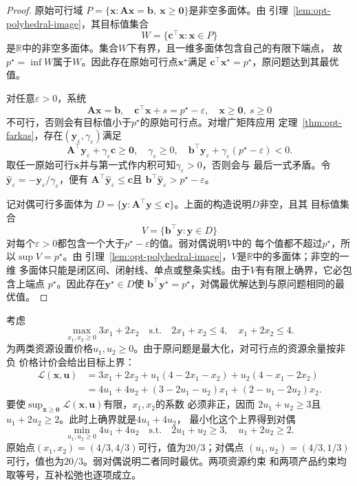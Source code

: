\begin{proof}
原始可行域
$P=\{\bm{x}:\bm{A}\bm{x}=\bm{b},\ \bm{x}\geq\bm{0}\}$是非空多面体。由
引理~\ref{lem:opt-polyhedral-image}，其目标值集合
\[
  W=\{\bm{c}^{\top}\bm{x}:\bm{x}\in P\}
\]
是$\mathbb{R}$中的非空多面体。集合$W$下有界，且一维多面体包含自己的有限下端点，
故$p^\star=\inf W$属于$W$。因此存在原始可行点$\bm{x}^{\star}$满足
$\bm{c}^{\top}\bm{x}^{\star}=p^\star$，原问题达到其最优值。

对任意$\varepsilon>0$，系统
\[
  \bm{A}\bm{x}=\bm{b},\quad
  \bm{c}^{\top}\bm{x}+s=p^\star-\varepsilon,\quad
  \bm{x}\geq\bm{0},\ s\geq0
\]
不可行，否则会有目标值小于$p^\star$的原始可行点。对增广矩阵应用
定理~\ref{thm:opt-farkas}，存在$(\bm{y}_{\varepsilon},\gamma_\varepsilon)$满足
\[
  \bm{A}^{\top}\bm{y}_{\varepsilon}
  +\gamma_\varepsilon\bm{c}\geq\bm{0},\quad
  \gamma_\varepsilon\geq0,\quad
  \bm{b}^{\top}\bm{y}_{\varepsilon}
  +\gamma_\varepsilon(p^\star-\varepsilon)<0.
\]
取任一原始可行$\bar{\bm{x}}$并与第一式作内积可知$\gamma_\varepsilon>0$，否则会与
最后一式矛盾。令
$\widehat{\bm{y}}_\varepsilon=-\bm{y}_\varepsilon/\gamma_\varepsilon$，便有
$\bm{A}^{\top}\widehat{\bm{y}}_\varepsilon\leq\bm{c}$且
$\bm{b}^{\top}\widehat{\bm{y}}_\varepsilon>p^\star-\varepsilon$。

记对偶可行多面体为
$D=\{\bm{y}:\bm{A}^{\top}\bm{y}\leq\bm{c}\}$。上面的构造说明$D$非空，且其
目标值集合
\[
  V=\{\bm{b}^{\top}\bm{y}:\bm{y}\in D\}
\]
对每个$\varepsilon>0$都包含一个大于$p^\star-\varepsilon$的值。弱对偶说明$V$中的
每个值都不超过$p^\star$，所以$\sup V=p^\star$。由
引理~\ref{lem:opt-polyhedral-image}，$V$是$\mathbb{R}$中的多面体；非空的一维
多面体只能是闭区间、闭射线、单点或整条实线。由于$V$有有限上确界，它必包含上端点
$p^\star$。因此存在$\bm{y}^{\star}\in D$使
$\bm{b}^{\top}\bm{y}^{\star}=p^\star$，对偶最优解达到与原问题相同的最优值。
\end{proof}

\begin{example}[二维资源分配的原始与对偶证书]
\label{ex:opt-resource-lp-duality}
考虑
\[
  \max_{x_1,x_2\geq0}3x_1+2x_2
  \quad\text{s.t.}\quad
  2x_1+x_2\leq4,\quad x_1+2x_2\leq4.
\]
为两类资源设置价格$u_1,u_2\geq0$。由于原问题是最大化，对可行点的资源余量按非负
价格计价会给出目标上界：
\begin{align*}
  \mathcal{L}(\bm{x},\bm{u})
  &=
  3x_1+2x_2
  +u_1(4-2x_1-x_2)+u_2(4-x_1-2x_2)\\
  &=
  4u_1+4u_2
  +(3-2u_1-u_2)x_1+(2-u_1-2u_2)x_2.
\end{align*}
要使$\sup_{\bm{x}\geq\bm{0}}\mathcal{L}(\bm{x},\bm{u})$有限，$x_1,x_2$的系数
必须非正，因而
$2u_1+u_2\geq3$且$u_1+2u_2\geq2$。此时上确界就是$4u_1+4u_2$，
最小化这个上界得到对偶
\[
  \min_{u_1,u_2\geq0}4u_1+4u_2
  \quad\text{s.t.}\quad
  2u_1+u_2\geq3,\quad u_1+2u_2\geq2.
\]
原始点$(x_1,x_2)=(4/3,4/3)$可行，值为$20/3$；对偶点
$(u_1,u_2)=(4/3,1/3)$可行，值也为$20/3$。弱对偶说明二者同时最优。两项资源约束
和两项产品约束均取等号，互补松弛也逐项成立。
\end{example}

